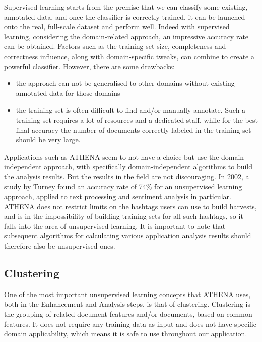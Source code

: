 Supervised learning starts from the premise that we can classify some existing, annotated data, and once the classifier is correctly trained, it can be launched onto the real, full-scale dataset and perform well. Indeed with supervised learning, considering the domain-related approach, an impressive accuracy rate can be obtained. Factors such as the training set size, completeness and correctness influence, along with domain-specific tweaks, can combine to create a powerful classifier. However, there are some drawbacks: 

\begin{itemize}
\item the approach can not be generalised to other domains without existing annotated data for those domains
\item the training set is often difficult to find  and/or manually annotate. Such a training set requires a lot of resources and a dedicated staff, while for the best final accuracy the number of documents correctly labeled in the training set should be very large.
\end{itemize}

Applications such as ATHENA seem to not have a choice but use the domain-independent approach, with specifically domain-independent algorithms to build the analysis results. But the results in the field are not discouraging. In 2002, a study by Turney \cite{turney2002thumbs} found an accuracy rate of 74\% for an unsupervised learning approach, applied to text processing and sentiment analysis in particular. ATHENA does not restrict limits on the hashtags users can use to build harvests, and is in the impossibility of building training sets for all such hashtags, so it falls into the area of unsupervised learning. It is important to note that subsequent algorithms for calculating various application analysis results should therefore also be unsupervised ones.

\subsection{Clustering}
One of the most important unsupervised learning concepts that ATHENA uses, both in the Enhancement and Analysis steps, is that of clustering. Clustering is the grouping of related document features and/or documents, based on common features. It does not require any training data as input and does not have specific domain applicability, which means it is safe to use throughout our application.

